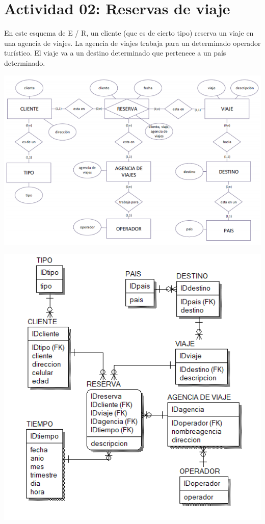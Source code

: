 \section{Actividad 02: Reservas de viaje} 

En este esquema de E / R, un cliente (que es de cierto tipo) reserva un viaje en una agencia de viajes. La agencia de viajes
trabaja para un determinado operador turístico. El viaje va a un destino determinado que pertenece a un país determinado.\\

	\begin{center}
	\includegraphics[width=15cm]{./Imagenes/img2}
	\end{center}	

	\begin{center}
	\includegraphics[width=15cm]{./Imagenes/img2-2}
	\end{center}	
